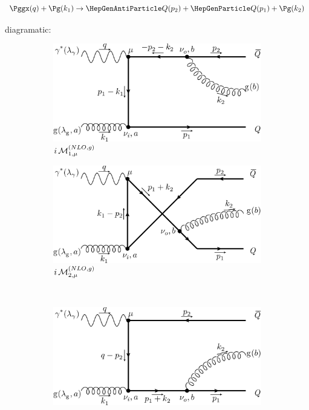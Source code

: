 \begin{equation}
\Pggx(q) + \Pg(k_1) \rightarrow \PaQ(p_2) + \PQ(p_1) + \Pg(k_2)
\end{equation}

diagramatic:
\begin{figure}[ht!]
	\centering
	\begin{subfigure}[t]{.4\textwidth}
		\includegraphics[width=\textwidth]{pyfeyn/nlo-g-1}
		\caption{$i\operatorname{\mathcal M}^{(NLO,g)}_{1,\mu}$}
	\end{subfigure}\hspace{.15\textwidth}%
	\begin{subfigure}[t]{.4\textwidth}
		\includegraphics[width=\textwidth]{pyfeyn/nlo-g-2}
		\caption{$i\operatorname{\mathcal M}^{(NLO,g)}_{2,\mu}$}
	\end{subfigure}\\
	\begin{subfigure}[t]{.42\textwidth}
		\includegraphics[width=\textwidth]{pyfeyn/nlo-g-3}

\end{subfigure}
\end{figure}
